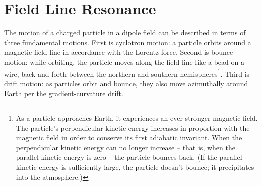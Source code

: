 


\chapter{Field Line Resonance}
  \label{ch_flrs}





The motion of a charged particle in a dipole field can be described in terms of three fundamental motions. First is cyclotron motion: a particle orbits around a magnetic field line in accordance with the Lorentz force. Second is bounce motion: while orbiting, the particle moves along the field line like a bead on a wire, back and forth between the northern and southern hemispheres\footnote{As a particle approaches Earth, it experiences an ever-stronger magnetic field. The particle's perpendicular kinetic energy increases in proportion with the magnetic field in order to conserve its first adiabatic invariant. When the perpendicular kinetic energy can no longer increase -- that is, when the parallel kinetic energy is zero -- the particle bounces back. (If the parallel kinetic energy is sufficiently large, the particle doesn't bounce; it precipitates into the atmosphere.)}. Third is drift motion: as particles orbit and bounce, they also move azimuthally around Earth per the gradient-curvature drift. 

